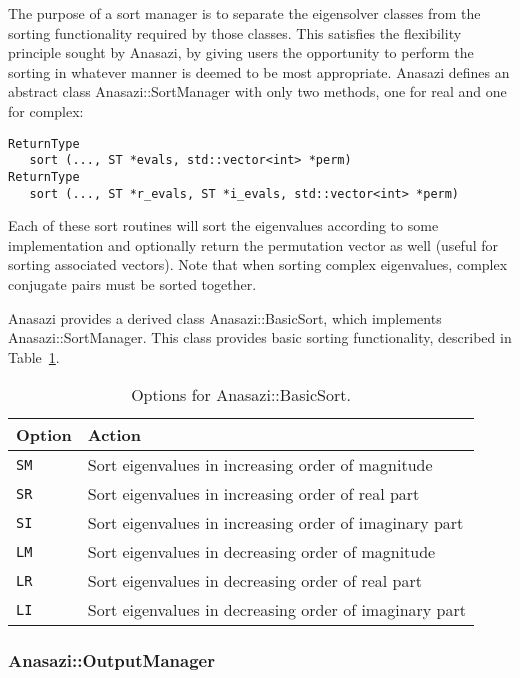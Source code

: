 The purpose of a sort manager is to separate the eigensolver classes from the
sorting functionality required by those classes. This satisfies the flexibility
principle sought by Anasazi, by giving users the opportunity to perform the
sorting in whatever manner is deemed to be most appropriate. Anasazi defines an
abstract class Anasazi::SortManager with only two methods, one for real
and one for complex:
\begin{verbatim}
ReturnType  
   sort (..., ST *evals, std::vector<int> *perm) 
ReturnType 
   sort (..., ST *r_evals, ST *i_evals, std::vector<int> *perm)
\end{verbatim}
Each of these sort routines will sort the eigenvalues according to some
implementation and optionally return the permutation vector as well (useful for
sorting associated vectors). Note that when sorting complex eigenvalues, complex
conjugate pairs must be sorted together.

Anasazi provides a derived class Anasazi::BasicSort, which implements
Anasazi::SortManager. This class provides basic sorting functionality,
described in Table~\ref{tab:anasazi:sm}.

\begin{table}
\begin{center}
\begin{tabular}{| p{2cm} l |}
\hline
Option & Action \\
\hline
{\tt SM} & Sort eigenvalues in increasing order of magnitude \\
{\tt SR} & Sort eigenvalues in increasing order of real part \\
{\tt SI} & Sort eigenvalues in increasing order of imaginary part \\
{\tt LM} & Sort eigenvalues in decreasing order of magnitude \\
{\tt LR} & Sort eigenvalues in decreasing order of real part \\
{\tt LI} & Sort eigenvalues in decreasing order of imaginary part \\
\hline
\end{tabular}
\caption{Options for Anasazi::BasicSort.}
\label{tab:anasazi:sm}
\end{center}
\end{table}


\subsubsection{Anasazi::OutputManager}
\label{sec:anasazi:om}

